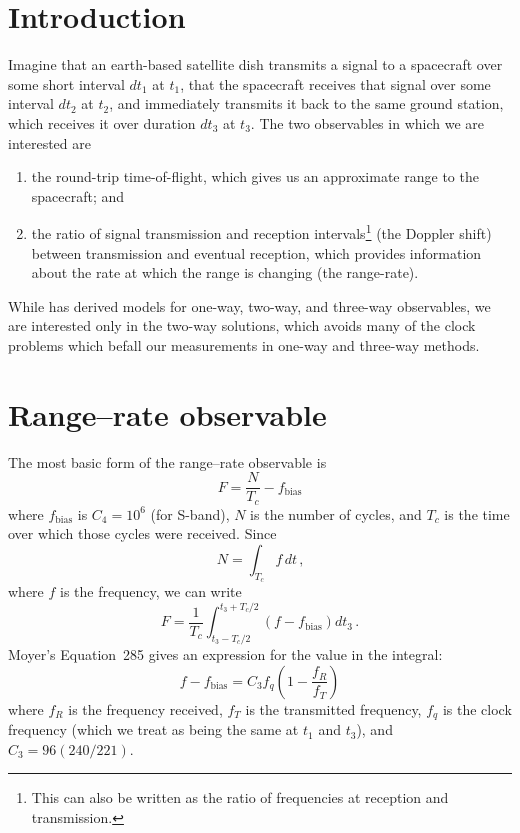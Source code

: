\documentclass[12pt]{article}
\begin{document}
\maketitle

\section{Introduction}
Imagine that an earth-based satellite dish transmits a signal to a spacecraft over some short interval $dt_1$ at $t_1$, that the spacecraft receives that signal over some interval $dt_2$ at $t_2$, and immediately transmits it back to the same ground station, which receives it over duration $dt_3$ at $t_3$. The two observables in which we are interested are 
\begin{enumerate}
\item the round-trip time-of-flight, which gives us an approximate range to the spacecraft; and
\item the ratio of signal transmission and reception intervals\footnote{This can also be written as the ratio of frequencies at reception and transmission.} (the Doppler shift) between transmission and eventual reception, which provides information about the rate at which the range is changing (the range-rate).
\end{enumerate}

While \citet{Moyer1971} has derived models for one-way, two-way, and three-way observables, we are interested only in the two-way solutions, which avoids many of the clock problems which befall our measurements in one-way and three-way methods. 

\section{Range--rate observable}
The most basic form of the range--rate observable is
\begin{equation}
F = \frac{N}{T_c} - f_\text{bias}
\end{equation}
where $f_\text{bias}$ is $C_4=10^6$ (for S-band), $N$ is the number of cycles, and $T_c$ is the time over which those cycles were received. Since
\begin{equation}
N = \int_{T_c} f\,dt\,\text{,}
\end{equation}
where $f$ is the frequency, we can write
\begin{equation}
F = \frac{1}{T_c}\int_{t_3 - T_c/2}^{t_3 + T_c/2} (f - f_\text{bias}) dt_3\,\text{.}
\end{equation}
Moyer's Equation~285 gives an expression for the value in the integral:
\begin{equation}
f - f_\text{bias} = C_3 f_q \left(1 - \frac{f_R}{f_T}\right)
\end{equation}
where $f_R$ is the frequency received, $f_T$ is the transmitted frequency, $f_q$ is the clock frequency (which we treat as being the same at $t_1$ and $t_3$), and $C_3=96(240/221)$. 
\end{document}
